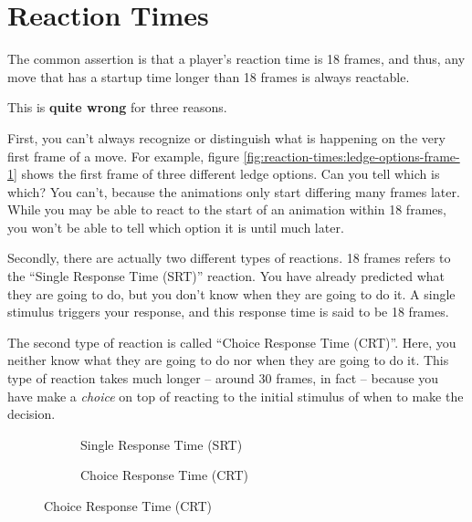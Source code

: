 \section{Reaction Times}
\label{sec:reaction-times}

The common assertion is that a player's  reaction  time is 18 frames, and thus,
any move that has a startup time longer than 18  frames  is  always  reactable.

This is \textbf{quite wrong} for three reasons.

First, you can't always recognize  or distinguish what is happening on the very
first      frame      of       a       move.      For      example,      figure
\ref{fig:reaction-times:ledge-options-frame-1}  shows the first frame of  three
different  ledge options. Can you tell which is which? You can't,  because  the
animations only  start  differing  many  frames later. While you may be able to
react to the start  of an animation within 18 frames, you won't be able to tell
which option it is until much later.

Secondly, there are actually two different types of reactions. 18 frames refers
to the ``Single Response Time (SRT)'' reaction. You have already predicted what
they are going to do, but you don't know when they are going to do it. A single
stimulus  triggers your response, and this response  time  is  said  to  be  18
frames.

The second type of reaction is called ``Choice Response Time (CRT)''. Here, you
neither  know  what they are going to do nor when they are going to do it. This
type  of reaction takes much longer -- around 30 frames, in fact -- because you
have make a \emph{choice} on top of reacting to the initial stimulus of when to
make the decision.

\begin{figure}[ht]
    \centering
    \begin{subfigure}[t]{0.48\linewidth}
        \caption{Single Response Time (SRT)}
    \end{subfigure}
    \begin{subfigure}[t]{0.48\linewidth}
        \caption{Choice Response Time (CRT)}
    \end{subfigure}
\end{figure}
